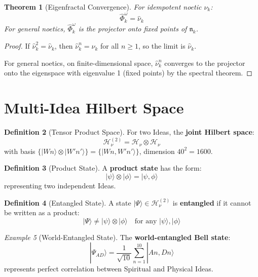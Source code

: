 \documentclass[11pt,twoside,openright]{book}
\theoremstyle{definition}
\newtheorem{definition}{Definition}[chapter]
\theoremstyle{plain}
\newtheorem{theorem}[definition]{Theorem}
\theoremstyle{remark}
\newtheorem{example}[definition]{Example}
\newcommand{\noe}[1]{\nu_{#1}}
\newcommand{\Hspace}{\mathcal{H}}
\newcommand{\qket}[1]{|#1\rangle}
\newcommand{\qop}[1]{\hat{#1}}
\begin{document}
\begin{theorem}[Eigenfractal Convergence]
\label{thm:eigenfractal-convergence}
For idempotent noetic $\noe{k}$:
\[
\qop{\Phi}_k^\omega = \qop{\nu}_k
\]
For general noetics, $\qop{\Phi}_k^\omega$ is the projector onto fixed points of $\mathfrak{n}_k$.
\end{theorem}

\begin{proof}
If $\qop{\nu}_k^2 = \qop{\nu}_k$, then $\qop{\nu}_k^n = \qop{\nu}_k$ for all $n \geq 1$, so the limit is $\qop{\nu}_k$.

For general noetics, on finite-dimensional space, $\qop{\nu}_k^n$ converges to the projector onto the eigenspace with eigenvalue 1 (fixed points) by the spectral theorem.
\end{proof}

\section{Multi-Idea Hilbert Space}

\begin{definition}[Tensor Product Space]
\label{def:tensor-product}
For two Ideas, the \textbf{joint Hilbert space}:
\[
\Hspace_\nu^{(2)} = \Hspace_\nu \otimes \Hspace_\nu
\]
with basis $\{\qket{Wn} \otimes \qket{W'n'}\} = \{\qket{Wn, W'n'}\}$, dimension $40^2 = 1600$.
\end{definition}

\begin{definition}[Product State]
\label{def:product-state}
A \textbf{product state} has the form:
\[
\qket{\psi} \otimes \qket{\phi} = \qket{\psi, \phi}
\]
representing two independent Ideas.
\end{definition}

\begin{definition}[Entangled State]
\label{def:entangled-state}
A state $\qket{\Psi} \in \Hspace_\nu^{(2)}$ is \textbf{entangled} if it cannot be written as a product:
\[
\qket{\Psi} \neq \qket{\psi} \otimes \qket{\phi} \quad \text{for any } \qket{\psi}, \qket{\phi}
\]
\end{definition}

\begin{example}[World-Entangled State]
\label{ex:world-entangled}
The \textbf{world-entangled Bell state}:
\[
\qket{\Psi_{AD}} = \frac{1}{\sqrt{10}} \sum_{n=1}^{10} \qket{An, Dn}
\]
represents perfect correlation between Spiritual and Physical Ideas.
\end{example}
\end{document}

